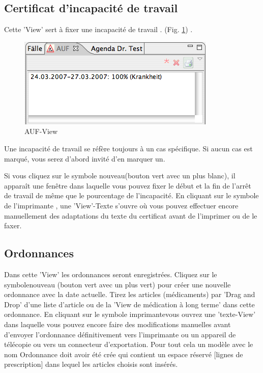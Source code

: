\subsection{Certificat d'incapacité de travail}
Cette 'View' sert à fixer une incapacité de travail . (Fig. \ref{fig:auf})
 .
\begin{figure}
  \includegraphics{images/aufview}
  \caption{AUF-View}
  \label{fig:auf}
\end{figure}
Une incapacité de travail se réfère toujours à un cas spécifique. Si aucun cas est marqué, vous serez d'abord invité d'en marquer un.

Si vous cliquez sur le symbole  \glqq nouveau\grqq (bouton vert avec un plus blanc), il apparaît une fenêtre dans laquelle vous pouvez fixer le début et la fin de l'arrêt de travail de même que le pourcentage de l'incapacité.
En cliquant sur le symbole de \glqq l'imprimante \grqq, une 'View'-Texte s'ouvre où vous pouvez effectuer encore manuellement des adaptations du texte du certificat avant de l'imprimer ou de le faxer.

\subsection{Ordonnances}
Dans cette 'View' les ordonnances seront enregistrées.   Cliquez sur le symbole\glqq nouveau\grqq
(bouton vert avec un plus vert) pour créer une nouvelle ordonnance avec la date actuelle. Tirez les articles (médicaments) par 'Drag and Drop' d'une liste d'article ou de la 'View de médication à long terme' dans cette ordonnance. En cliquant sur le symbole \glqq imprimante\grqq vous ouvrez une 'texte-View' dans laquelle vous pouvez encore faire des modifications manuelles avant d'envoyer l'ordonnance définitivement vers l'imprimante ou un appareil de télécopie ou vers un connecteur d'exportation. Pour tout cela un modèle avec le nom  \glqq Ordonnance\grqq
doit avoir été crée qui contient un espace réservé [lignes de prescription] dans lequel les articles choisis sont insérés.


